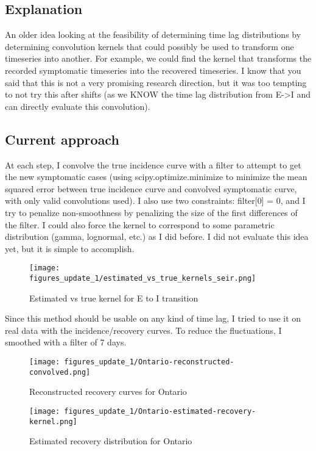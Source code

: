 \documentclass{article}
\begin{document}
\subsection{Explanation}
An older idea looking at the feasibility of determining time lag distributions by determining convolution kernels that could possibly be used to transform one timeseries into another. For example, we could find the kernel that transforms the recorded symptomatic timeseries into the recovered timeseries. I know that you said that this is not a very promising research direction, but it was too tempting to not try this after shifts (as we KNOW the time lag distribution from E->I and can directly evaluate this convolution). 

\subsection{Current approach}
At each step, I convolve the true incidence curve with a filter to attempt to get the new symptomatic cases (using scipy.optimize.minimize to minimize the mean squared error between true incidence curve and convolved symptomatic curve, with only valid convolutions used).
I also use two constraints: filter[0] = 0, and I try to penalize non-smoothness by penalizing the size of the first differences of the filter.
I could also force the kernel to correspond to some parametric distribution (gamma, lognormal, etc.) as I did before. I did not evaluate this idea yet, but it is simple to accomplish. 

\begin{figure}[h!]
    \centering
    \texttt{[image: figures\_update\_1/estimated\_vs\_true\_kernels\_seir.png]}
    \caption{Estimated vs true kernel for E to I transition}
    \label{fig:my_label}
\end{figure}

Since this method should be usable on any kind of time lag, I tried to use it on real data with the incidence/recovery curves. To reduce the fluctuations, I smoothed with a filter of 7 days.

\begin{figure}[h!]
    \centering
    \texttt{[image: figures\_update\_1/Ontario-reconstructed-convolved.png]}
    \caption{Reconstructed recovery curves for Ontario}
    \label{fig:my_label}
\end{figure}

\begin{figure}[h!!!]
    \centering
    \texttt{[image: figures\_update\_1/Ontario-estimated-recovery-kernel.png]}
    \caption{Estimated recovery distribution for Ontario}
    \label{fig:my_label}
\end{figure}
\end{document}
